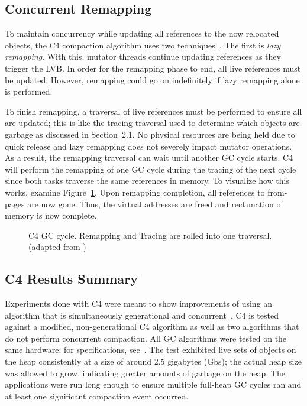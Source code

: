 \documentclass{sig-alternate}
\begin{document}
\subsection{Concurrent Remapping}
\label{sec:c4Remapping}

To maintain concurrency while updating all references to the now relocated
objects, the C4 compaction algorithm uses two techniques~\cite{Tene:C4}. The first is
\emph{lazy remapping}. With this, mutator
threads continue updating references as they trigger the LVB. In order for
the remapping phase to end, all live references must be updated.
However, remapping could go on indefinitely if lazy remapping alone is performed.

To finish remapping, a traversal of live references must be performed to
ensure all are updated; this is like the tracing traversal used to determine which
objects are garbage as discussed in Section~2.1. No physical resources are being held due
to quick release and lazy remapping does not severely impact mutator operations. 
As a result, the remapping traversal can wait until another GC cycle starts.
C4 will perform the remapping of one GC cycle during the tracing
of the next cycle since both tasks traverse
the same references in memory. To
visualize how this works, examine Figure~\ref{fig:c4Cycle}. Upon remapping completion, 
all references to from-pages are now gone. Thus, the virtual addresses
are freed and reclamation of memory is now complete. 

\begin{figure}
\centering
{}
\caption{C4 GC cycle. Remapping and Tracing are rolled into one traversal.
(adapted from \cite{Tene:C4})}
\label{fig:c4Cycle}
\end{figure}


\subsection{C4 Results Summary}
\label{sec:c4Results}


Experiments done with C4 were meant to show improvements
of using an algorithm that is simultaneously generational and concurrent~\cite{Tene:C4}.
C4 is tested against a modified, non-generational C4 algorithm as well as
two algorithms that do not perform concurrent compaction. 
All GC algorithms were tested on the same hardware; for specifications, see~\cite{Tene:C4}. 
The test exhibited live sets of objects on 
the heap consistently at a size of around 2.5 gigabytes (Gbs); the actual heap size was allowed 
to grow, indicating greater amounts of garbage on the heap. The applications were run long
enough to ensure multiple full-heap GC cycles ran and at least one
significant compaction event occurred.
\end{document}

